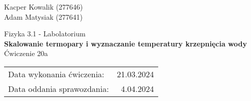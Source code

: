\begin{flushright}
    Kacper Kowalik (277646) \\
    Adam Matysiak (277641)
\end{flushright}

\vspace{2mm}

\begin{center}
    Fizyka 3.1 - Labolatorium \\
    \vspace{15px}
    {\Large{\textbf{Skalowanie termopary i wyznaczanie temperatury krzepnięcia wody}}} \\
    \vspace{15px}
    Ćwiczenie 20a \\
\end{center}

\begin{flushright}
    \begin{tabular}{lr}
         Data wykonania ćwiczenia:  & 21.03.2024 \\
         Data oddania sprawozdania: & 4.04.2024
    \end{tabular}
\end{flushright}

